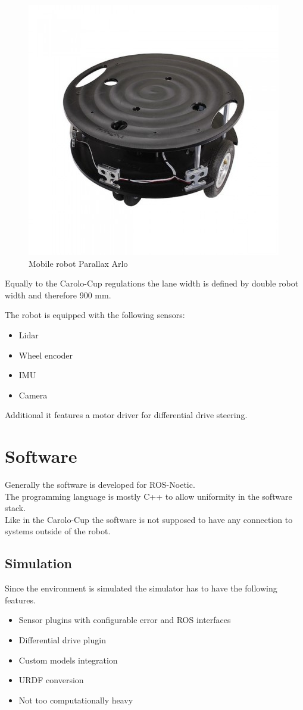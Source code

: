 \begin{figure}[H]
	\centering
	\includegraphics[width=.7\textwidth]{arlo real}
	
	\caption{Mobile robot Parallax Arlo \cite{arloreal}}
	\label{arlore}
\end{figure}


Equally to the Carolo-Cup regulations the lane width is defined by double robot width and therefore 900 mm. 

The robot is equipped with the following sensors:

\begin{itemize}
	\item Lidar
	\item Wheel encoder
	\item IMU
	\item Camera
\end{itemize}

Additional it features a motor driver for differential drive steering.

\section{Software}
Generally the software is developed for ROS-Noetic.\\
The programming language is mostly C++ to allow uniformity in the software stack.\\
Like in the Carolo-Cup the software is not supposed to have any connection to systems outside of the robot.\\

\subsection{Simulation}
Since the environment is simulated the simulator has to have the following features.
\begin{itemize}
	\item Sensor plugins with configurable error and ROS interfaces
	\item Differential drive plugin
	\item Custom models integration
	\item URDF conversion
	\item Not too computationally heavy
\end{itemize}

